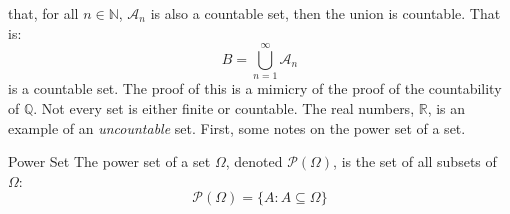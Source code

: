 \documentclass[crop=false,class=book,oneside]{standalone}
\begin{document}
            that, for all $n\in\mathbb{N}$, $\mathcal{A}_{n}$ is
            also a countable set, then the union is countable. That is:
            \begin{equation}
                B=\bigcup_{n=1}^{\infty}\mathcal{A}_{n}
            \end{equation}
            is a countable set. The proof of this is a mimicry of
            the proof of the countability of $\mathbb{Q}$. Not
            every set is either finite or countable. The real numbers,
            $\mathbb{R}$, is an example of an \textit{uncountable}
            set. First, some notes on the power set of a set.
            \begin{ldefinition}{Power Set}
                The power set of a set $\Omega$, denoted
                $\mathcal{P}(\Omega)$, is the set of all subsets of
                $\Omega$:
                \begin{equation}
                    \mathcal{P}(\Omega)=
                    \{A:A\subseteq\Omega\}
                \end{equation}
            \end{ldefinition}
\end{document}
